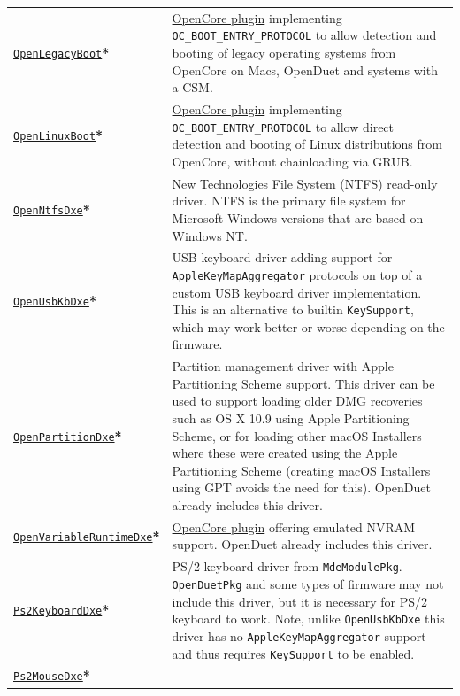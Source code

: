 \documentclass[]{article}
\begin{document}
\begin{longtable}{p{1.65in}p{5.25in}}
\href{https://github.com/acidanthera/OpenCorePkg}{\texttt{OpenLegacyBoot}}\textbf{*}
& \hyperref[legacyboot]{OpenCore plugin} implementing \texttt{OC\_BOOT\_ENTRY\_PROTOCOL}
  to allow detection and booting of legacy operating systems from OpenCore on Macs, OpenDuet
  and systems with a CSM. \\
\href{https://github.com/acidanthera/OpenCorePkg}{\texttt{OpenLinuxBoot}}\textbf{*}
& \hyperref[uefilinux]{OpenCore plugin} implementing \texttt{OC\_BOOT\_ENTRY\_PROTOCOL}
  to allow direct detection and booting of Linux distributions from OpenCore, without
  chainloading via GRUB. \\
\href{https://github.com/acidanthera/OpenCorePkg}{\texttt{OpenNtfsDxe}}\textbf{*}
& New Technologies File System (NTFS) read-only driver.
  NTFS is the primary file system for Microsoft Windows versions that are based on Windows NT. \\
\href{https://github.com/acidanthera/OpenCorePkg}{\texttt{OpenUsbKbDxe}}\textbf{*}
& USB keyboard driver adding support for \texttt{AppleKeyMapAggregator} protocols
  on top of a custom USB keyboard driver implementation. This is an alternative to
  builtin \texttt{KeySupport}, which may work better or worse depending on the firmware. \\
\href{https://github.com/acidanthera/OpenCorePkg}{\texttt{OpenPartitionDxe}}\textbf{*}
& Partition management driver with Apple Partitioning Scheme support.
  This driver can be used to support loading older DMG recoveries such as OS X 10.9
  using Apple Partitioning Scheme, or for loading other macOS Installers where these were
  created using the Apple Partitioning Scheme (creating macOS Installers using GPT avoids
  the need for this). OpenDuet already includes this driver. \\
\href{https://github.com/acidanthera/OpenCorePkg}{\texttt{OpenVariableRuntimeDxe}}\textbf{*}
& \hyperref[emunvram]{OpenCore plugin} offering emulated NVRAM support. OpenDuet already
includes this driver. \\
\href{https://github.com/acidanthera/audk}{\texttt{Ps2KeyboardDxe}}\textbf{*}
& PS/2 keyboard driver from \texttt{MdeModulePkg}. \texttt{OpenDuetPkg} and some types of firmware
  may not include this driver, but it is necessary for PS/2 keyboard to work.
  Note, unlike \texttt{OpenUsbKbDxe} this driver has no \texttt{AppleKeyMapAggregator}
  support and thus requires \texttt{KeySupport} to be enabled. \\
\href{https://github.com/acidanthera/audk}{\texttt{Ps2MouseDxe}}\textbf{*}

\end{longtable}
\end{document}
